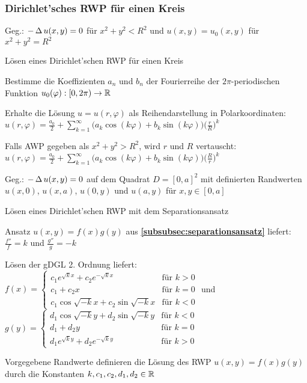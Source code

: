 \documentclass[german,color,5pt]{latex4ei/latex4ei_fs}
\begin{document}
\begin{sectionbox}
	\subsubsection{Dirichlet'sches RWP für einen Kreis}
	Geg.: $-\operatorname{\Delta} u(x,y)=0$ für $x^2+y^2<R^2$ und $u(x,y)=u_0(x,y)$ für $x^2+y^2=R^2$
	\begin{cookbox}{Lösen eines Dirichlet'schen RWP für einen Kreis}
		\item Bestimme die Koeffizienten $a_n$ und $b_n$ der Fourierreihe der $2\pi$-periodischen Funktion $u_0(\varphi):[0,2\pi)\rightarrow \operatorname{\mathbb R}$
		\item Erhalte die Lösung $u=u(r,\varphi)$ als Reihendarstellung in Polarkoordinaten:\\
		$u(r,\varphi)=\frac{a_0}{2}+\sum_{k=1}^{\infty}\bigl(a_k \cos(k\varphi)+b_k \sin(k\varphi)\bigr)\big(\frac{r}{R}\big)^k$
		\item Falls AWP gegeben als $x^2+y^2>R^2$, wird $r$ und $R$ vertauscht:\\
		$u(r,\varphi)=\frac{a_0}{2}+\sum_{k=1}^{\infty}\bigl(a_k \cos(k\varphi)+b_k \sin(k\varphi)\bigr)\big(\frac{R}{r}\big)^k$
	\end{cookbox}
	Geg.: $-\operatorname{\Delta} u(x,y)=0$ auf dem Quadrat $D=[0,a]^2$ mit definierten Randwerten $u(x,0)$, $u(x,a)$, $u(0,y)$ und $u(a,y)$ für $x,y\in [0,a]$
	\begin{cookbox}{Lösen eines Dirichlet'schen RWP mit dem Separationsansatz}
		\item Ansatz $u(x,y)=f(x)g(y)$ aus {\bf\ref{subsubsec:separationsansatz}} liefert: $\frac{f''}{f}=k$ und $\frac{g''}{g}=-k$
		\item Lösen der gDGL 2. Ordnung liefert:\\
		$f(x)=\begin{cases}
		c_1e^{\sqrt{k}x}+c_2e^{-\sqrt{k}x} & \text{für } k>0\\
		c_1+c_2x & \text{für }  k=0\\
		c_1\cos\sqrt{-k}x+c_2\sin\sqrt{-k}x & \text{für } k<0
		\end{cases}$ \qquad und \\
		$g(y)=\begin{cases}
		d_1\cos\sqrt{-k}y+d_2\sin\sqrt{-k}y & \text{für } k<0\\
		d_1+d_2y & \text{für }  k=0\\
		d_1e^{\sqrt{k}y}+d_2e^{-\sqrt{k}y} & \text{für } k>0
		\end{cases}$
		\item Vorgegebene Randwerte definieren die Lösung des RWP $u(x,y)=f(x)g(y)$ durch die Konstanten $k,c_1,c_2,d_1,d_2\in\operatorname{\mathbb R}$
	\end{cookbox}
\end{sectionbox}


\end{document}
